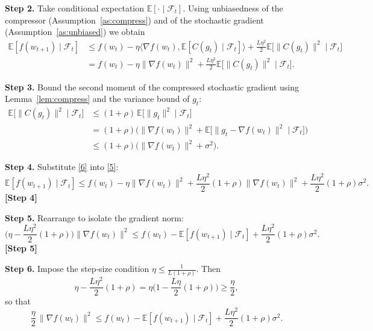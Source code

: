 \documentclass{article}
\begin{document}
\noindent\textbf{Step 2.} Take conditional expectation $\mathbb{E}[\cdot\mid\mathcal{F}_t]$.
Using unbiasedness of the compressor (Assumption~\ref{as:compress}) and of the stochastic gradient (Assumption~\ref{as:unbiased}) we obtain
\[
\begin{aligned}
\mathbb{E}[f(w_{t+1})\mid\mathcal{F}_t]
&\le f(w_t)-\eta\Big\langle\nabla f(w_t),\mathbb{E}[C(g_t)\mid\mathcal{F}_t]\Big\rangle
   +\frac{L\eta^{2}}{2}\mathbb{E}\!\big[\|C(g_t)\|^{2}\mid\mathcal{F}_t\big] \\
&= f(w_t)-\eta\|\nabla f(w_t)\|^{2}
   +\frac{L\eta^{2}}{2}\mathbb{E}\!\big[\|C(g_t)\|^{2}\mid\mathcal{F}_t\big].
\end{aligned}
\tag{5}
\]

\noindent\textbf{Step 3.} Bound the second moment of the compressed stochastic gradient using Lemma~\ref{lem:compress} and the variance bound of $g_t$:
\[
\begin{aligned}
\mathbb{E}\!\big[\|C(g_t)\|^{2}\mid\mathcal{F}_t\big]
&\le (1+\rho)\,\mathbb{E}\!\big[\|g_t\|^{2}\mid\mathcal{F}_t\big] \\
&= (1+\rho)\Big(\|\nabla f(w_t)\|^{2}
      +\mathbb{E}\!\big[\|g_t-\nabla f(w_t)\|^{2}\mid\mathcal{F}_t\big]\Big) \\
&\le (1+\rho)\Big(\|\nabla f(w_t)\|^{2}+\sigma^{2}\Big).
\end{aligned}
\tag{6}
\]

\noindent\textbf{Step 4.} Substitute \eqref{6} into \eqref{5}:
\[
\mathbb{E}[f(w_{t+1})\mid\mathcal{F}_t]
\le f(w_t)-\eta\|\nabla f(w_t)\|^{2}
   +\frac{L\eta^{2}}{2}(1+\rho)\|\nabla f(w_t)\|^{2}
   +\frac{L\eta^{2}}{2}(1+\rho)\sigma^{2}.
\tag{7}
\]
\textbf{[Step 4]}

\noindent\textbf{Step 5.} Rearrange to isolate the gradient norm:
\[
\Big(\eta-\frac{L\eta^{2}}{2}(1+\rho)\Big)\|\nabla f(w_t)\|^{2}
\le f(w_t)-\mathbb{E}[f(w_{t+1})\mid\mathcal{F}_t]
   +\frac{L\eta^{2}}{2}(1+\rho)\sigma^{2}.
\tag{8}
\]
\textbf{[Step 5]}

\noindent\textbf{Step 6.} Impose the step‑size condition $\displaystyle \eta\le\frac{1}{L(1+\rho)}$.
Then
\[
\eta-\frac{L\eta^{2}}{2}(1+\rho)
= \eta\Big(1-\frac{L\eta}{2}(1+\rho)\Big)
\ge \frac{\eta}{2},
\]
so that
\[
\frac{\eta}{2}\,\|\nabla f(w_t)\|^{2}
\le f(w_t)-\mathbb{E}[f(w_{t+1})\mid\mathcal{F}_t]
   +\frac{L\eta^{2}}{2}(1+\rho)\sigma^{2}.
\tag{9}
\]
\end{document}
